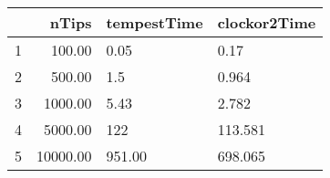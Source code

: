\begin{table}[ht]
\centering
\begin{tabular}{rrll}
  \hline
 & nTips & tempestTime & clockor2Time \\ 
  \hline
1 & 100.00 & 0.05 & 0.17 \\ 
  2 & 500.00 & 1.5 & 0.964 \\ 
  3 & 1000.00 & 5.43 & 2.782 \\ 
  4 & 5000.00 & 122 & 113.581 \\ 
  5 & 10000.00 & 951.00 & 698.065 \\ 
   \hline
\end{tabular}
\end{table}
